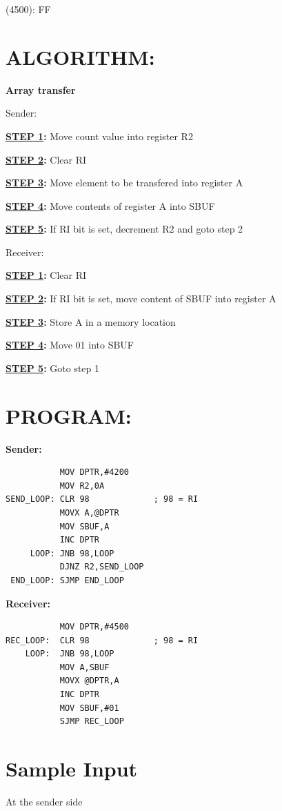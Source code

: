 \documentclass[a4paper,28pt]{report}
\begin{document}
(4500): FF

\section*{ALGORITHM:}
\textbf{Array transfer}

\large{Sender:}

\textbf{\underline{STEP 1}:} Move count value into register R2

\textbf{\underline{STEP 2}:} Clear RI

\textbf{\underline{STEP 3}:} Move element to be transfered into register A

\textbf{\underline{STEP 4}:} Move contents of register A into SBUF

\textbf{\underline{STEP 5}:} If RI bit is set, decrement R2 and goto step 2

\vspace*{10pt}
\large{Receiver:}

\textbf{\underline{STEP 1}:} Clear RI 

\textbf{\underline{STEP 2}:} If RI bit is set, move content of SBUF into register A

\textbf{\underline{STEP 3}:} Store A in a memory location

\textbf{\underline{STEP 4}:} Move 01 into SBUF

\textbf{\underline{STEP 5}:} Goto step 1

\section*{PROGRAM:}
\textbf{Sender:}
\begin{lstlisting}
           MOV DPTR,#4200
           MOV R2,0A
SEND_LOOP: CLR 98             ; 98 = RI
           MOVX A,@DPTR
           MOV SBUF,A
           INC DPTR
     LOOP: JNB 98,LOOP
           DJNZ R2,SEND_LOOP
 END_LOOP: SJMP END_LOOP
\end{lstlisting}

\vspace{20pt}

\textbf{Receiver:}
\begin{lstlisting}
           MOV DPTR,#4500
REC_LOOP:  CLR 98             ; 98 = RI
    LOOP:  JNB 98,LOOP
           MOV A,SBUF
           MOVX @DPTR,A
           INC DPTR
           MOV SBUF,#01
           SJMP REC_LOOP
\end{lstlisting}


\section*{Sample Input}
At the sender side
\end{document}
